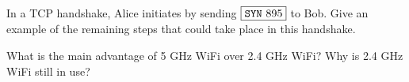 

\begin{exercise}
    In a TCP handshake, Alice initiates by sending $\boxed{\texttt{SYN}\ 895}$ to Bob. Give an example of the remaining steps that could take place in this handshake.
\end{exercise}

\begin{exercise}
    What is the main advantage of 5 GHz WiFi over 2.4 GHz WiFi? Why is 2.4 GHz WiFi still in use?
\end{exercise}